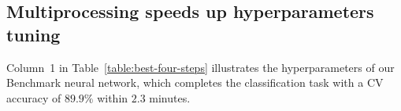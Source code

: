 \subsection{Multiprocessing speeds up hyperparameters tuning}
Column~1 in Table~\ref{table:best-four-steps} illustrates the hyperparameters of our Benchmark neural network, which completes the classification task with a CV accuracy of $89.9\%$ within $2.3$ minutes.
